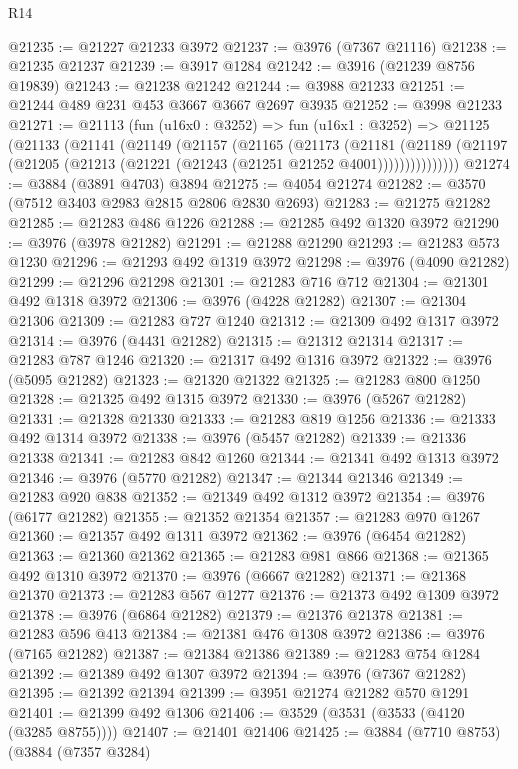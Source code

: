 \begin{lexlean}{R14}
\begin{coremodule}
@21235 := @21227 @21233 @3972
@21237 := @3976 (@7367 @21116)
@21238 := @21235 @21237
@21239 := @3917 @1284
@21242 := @3916 (@21239 @8756 @19839)
@21243 := @21238 @21242
@21244 := @3988 @21233
@21251 := @21244 @489 @231 @453 @3667 @3667 @2697 @3935
@21252 := @3998 @21233
@21271 := @21113
    (fun (u16x0 : @3252) =>
    fun (u16x1 : @3252) =>
    @21125
      (@21133
        (@21141
          (@21149
            (@21157
              (@21165
                (@21173
                  (@21181
                    (@21189
                      (@21197 (@21205 (@21213 (@21221 (@21243 (@21251 @21252 @4001)))))))))))))))
@21274 := @3884 (@3891 @4703) @3894
@21275 := @4054 @21274
@21282 := @3570 (@7512 @3403 @2983 @2815 @2806 @2830 @2693)
@21283 := @21275 @21282
@21285 := @21283 @486 @1226
@21288 := @21285 @492 @1320 @3972
@21290 := @3976 (@3978 @21282)
@21291 := @21288 @21290
@21293 := @21283 @573 @1230
@21296 := @21293 @492 @1319 @3972
@21298 := @3976 (@4090 @21282)
@21299 := @21296 @21298
@21301 := @21283 @716 @712
@21304 := @21301 @492 @1318 @3972
@21306 := @3976 (@4228 @21282)
@21307 := @21304 @21306
@21309 := @21283 @727 @1240
@21312 := @21309 @492 @1317 @3972
@21314 := @3976 (@4431 @21282)
@21315 := @21312 @21314
@21317 := @21283 @787 @1246
@21320 := @21317 @492 @1316 @3972
@21322 := @3976 (@5095 @21282)
@21323 := @21320 @21322
@21325 := @21283 @800 @1250
@21328 := @21325 @492 @1315 @3972
@21330 := @3976 (@5267 @21282)
@21331 := @21328 @21330
@21333 := @21283 @819 @1256
@21336 := @21333 @492 @1314 @3972
@21338 := @3976 (@5457 @21282)
@21339 := @21336 @21338
@21341 := @21283 @842 @1260
@21344 := @21341 @492 @1313 @3972
@21346 := @3976 (@5770 @21282)
@21347 := @21344 @21346
@21349 := @21283 @920 @838
@21352 := @21349 @492 @1312 @3972
@21354 := @3976 (@6177 @21282)
@21355 := @21352 @21354
@21357 := @21283 @970 @1267
@21360 := @21357 @492 @1311 @3972
@21362 := @3976 (@6454 @21282)
@21363 := @21360 @21362
@21365 := @21283 @981 @866
@21368 := @21365 @492 @1310 @3972
@21370 := @3976 (@6667 @21282)
@21371 := @21368 @21370
@21373 := @21283 @567 @1277
@21376 := @21373 @492 @1309 @3972
@21378 := @3976 (@6864 @21282)
@21379 := @21376 @21378
@21381 := @21283 @596 @413
@21384 := @21381 @476 @1308 @3972
@21386 := @3976 (@7165 @21282)
@21387 := @21384 @21386
@21389 := @21283 @754 @1284
@21392 := @21389 @492 @1307 @3972
@21394 := @3976 (@7367 @21282)
@21395 := @21392 @21394
@21399 := @3951 @21274 @21282 @570 @1291
@21401 := @21399 @492 @1306
@21406 := @3529 (@3531 (@3533 (@4120 (@3285 @8755))))
@21407 := @21401 @21406
@21425 := @3884
    (@7710 @8753)
    (@3884
      (@7357 @3284)

\end{coremodule}
\end{lexlean}
